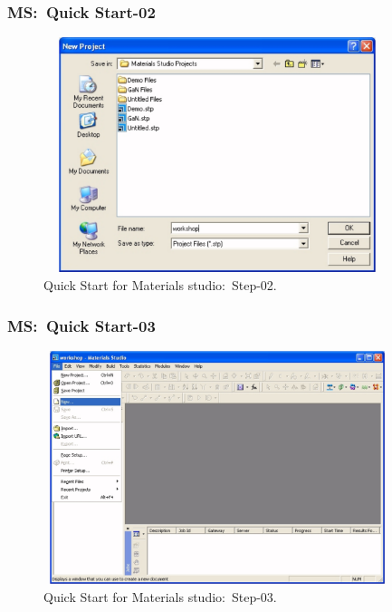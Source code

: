 \frame
{
	\frametitle{\textrm{MS:~Quick Start-02}}
\begin{figure}[h!]
\centering
\vspace*{-0.10in}
\includegraphics[height=2.70in,width=4.00in,viewport=0 0 1045 776,clip]{Figures/MS-New_Project-02.png}
\caption{\tiny \textrm{Quick Start for Materials studio:~Step-02.}}%
\label{MS-Quick_Start-02}
\end{figure}
}

\frame
{
	\frametitle{\textrm{MS:~Quick Start-03}}
\begin{figure}[h!]
\centering
\vspace*{-0.10in}
\includegraphics[height=2.68in,width=4.00in,viewport=0 0 1090 760,clip]{Figures/MS-New_Project-03.png}
\caption{\tiny \textrm{Quick Start for Materials studio:~Step-03.}}%
\label{MS-Quick_Start-03}
\end{figure}
}


